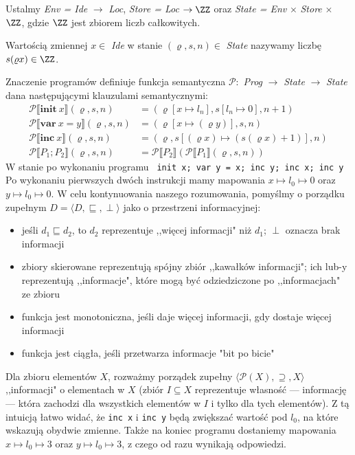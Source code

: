 \begin{solutions}
    Ustalmy \textit{Env = Ide} $\rightarrow$ \textit{Loc}, \textit{Store = Loc} $\rightarrow \ZZ$ oraz \textit{State = Env} $\times$ \textit{Store} $\times$ $\ZZ$, gdzie $\ZZ$ jest zbiorem liczb całkowitych.
    
    Wartością zmiennej $x \in $ \textit{Ide} w stanie $(\varrho, s, n) \in $ \textit{State} nazywamy liczbę $s(\varrho x) \in \ZZ$.
    
    Znaczenie programów definiuje funkcja semantyczna $\mathcal{P}:$ \textit{Prog} $\rightarrow$ \textit{State} $\rightarrow$ \textit{State} dana następującymi klauzulami semantycznymi:
    \begin{align*}
        \mathcal{P} \llbracket \textbf{init} \ x \rrbracket (\varrho, s, n) &= (\varrho[x \mapsto l_n], s[l_n \mapsto 0], n + 1) \\
        \mathcal{P} \llbracket \textbf{var} \ x = y \rrbracket (\varrho, s, n) &= (\varrho[x \mapsto (\varrho y)], s, n) \\
        \mathcal{P} \llbracket \textbf{inc} \ x \rrbracket (\varrho, s, n) &= (\varrho, s[(\varrho x) \mapsto (s(\varrho x) + 1)], n) \\
        \mathcal{P} \llbracket P_1; P_2 \rrbracket (\varrho, s, n) &= \mathcal{P} \llbracket P_2 \rrbracket(\mathcal{P} \llbracket P_1 \rrbracket(\varrho, s, n))
    \end{align*}
    W stanie po wykonaniu programu \texttt{
        init x;
        var y = x;
        inc y;
        inc x;
        inc y
    }
    Po wykonaniu pierwszych dwóch instrukcji mamy mapowania $x\mapsto l_0\mapsto 0$ oraz $y\mapsto l_0\mapsto 0$. W celu kontynuowania naszego rozumowania, pomyślmy o porządku zupełnym $D=\langle D,\sqsubseteq,\perp\rangle$ jako o przestrzeni informacyjnej:
    \begin{itemize}
        \item jeśli $d_1\sqsubseteq d_2$, to $d_2$ reprezentuje ,,więcej informacji" niż $d_1$; $\perp$ oznacza brak informacji
        \item zbiory skierowane reprezentują spójny zbiór ,,kawałków informacji"; ich lub-y reprezentują ,,informacje", które mogą być odziedziczone po ,,informacjach" ze zbioru
        \item funkcja jest monotoniczna, jeśli daje więcej informacji, gdy dostaje więcej informacji
        \item funkcja jest ciągła, jeśli przetwarza informacje "bit po bicie"
    \end{itemize}
    Dla zbioru elementów $X$, rozważmy porządek zupełny $\langle\mathcal{P}(X),\supseteq,X\rangle$ ,,informacji" o elementach w $X$ (zbiór $I\subseteq X$ reprezentuje własność --- informację --- która zachodzi dla wszystkich elementów w $I$ i tylko dla tych elementów). Z tą intuicją łatwo widać, że \texttt{inc x} i \texttt{inc y} będą zwiększać wartość pod $l_0$, na które wskazują obydwie zmienne. Także na koniec programu dostaniemy mapowania $x\mapsto l_0\mapsto 3$ oraz $y\mapsto l_0\mapsto 3$, z czego od razu wynikają odpowiedzi.


\end{solutions}
